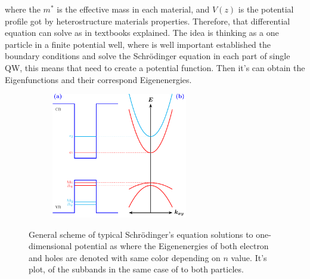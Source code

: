 where the $m^{*}$ is the effective mass in each material, and $V(z)$ is the potential profile got by heterostructure materials properties. Therefore, that differential equation can solve as in textbooks explained\cite{de2014introduccion,griffiths2018introduction,sakurai1995modern,cohen2019quantum,chuang1995physics,harrison2016quantum,fox2002optical,bastard1990wave}. The idea is thinking as a one particle in a finite potential well, where is well important established the boundary conditions and solve the Schrödinger equation in each part of single QW, this means that need to create a potential function. Then it's can obtain the Eigenfunctions and their correspond Eigenenergies.

\begin{figure}
	\begin{subfigure}{\textwidth}
		\centering
		\includegraphics[width=0.65\textwidth]{../figures/chapter-1/heterostructures/out/qw2}
		\label{subfig:subsection-1.2-single-quantum-well-scheme2-a)}
		\label{subfig:subsection-1.2-single-quantum-well-scheme2-b)}
	\end{subfigure}
	\caption{General scheme of typical Schrödinger's equation solutions to one-dimensional potential as  where the Eigenenergies of both electron and holes are denoted with same color depending on  $n$ value. It's plot, of the subbands in  the same case of   to both particles.  }
	\label{fig:subsection-1.2-single-quantum-well-scheme2}
\end{figure}

